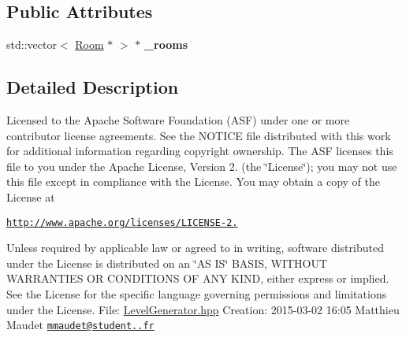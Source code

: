 \subsection*{Public Attributes}
\begin{DoxyCompactItemize}
\item 
\hypertarget{class_level_generator_aaeb382a82733c6d95569b9b77c0c3b11}{std\+::vector$<$ \hyperlink{class_room}{Room} $\ast$ $>$ $\ast$ {\bfseries \+\_\+rooms}}\label{class_level_generator_aaeb382a82733c6d95569b9b77c0c3b11}

\end{DoxyCompactItemize}


\subsection{Detailed Description}
Licensed to the Apache Software Foundation (A\+S\+F) under one or more contributor license agreements. See the N\+O\+T\+I\+C\+E file distributed with this work for additional information regarding copyright ownership. The A\+S\+F licenses this file to you under the Apache License, Version 2. (the \char`\"{}\+License\char`\"{}); you may not use this file except in compliance with the License. You may obtain a copy of the License at

\href{http://www.apache.org/licenses/LICENSE-2.0}{\tt http\+://www.\+apache.\+org/licenses/\+L\+I\+C\+E\+N\+S\+E-\/2.}

Unless required by applicable law or agreed to in writing, software distributed under the License is distributed on an \char`\"{}\+A\+S I\+S\char`\"{} B\+A\+S\+I\+S, W\+I\+T\+H\+O\+U\+T W\+A\+R\+R\+A\+N\+T\+I\+E\+S O\+R C\+O\+N\+D\+I\+T\+I\+O\+N\+S O\+F A\+N\+Y K\+I\+N\+D, either express or implied. See the License for the specific language governing permissions and limitations under the License. File\+: \hyperlink{_level_generator_8hpp_source}{Level\+Generator.\+hpp} Creation\+: 2015-\/03-\/02 16\+:05 Matthieu Maudet \href{mailto:mmaudet@student.42.fr}{\tt mmaudet@student..\+fr} 

